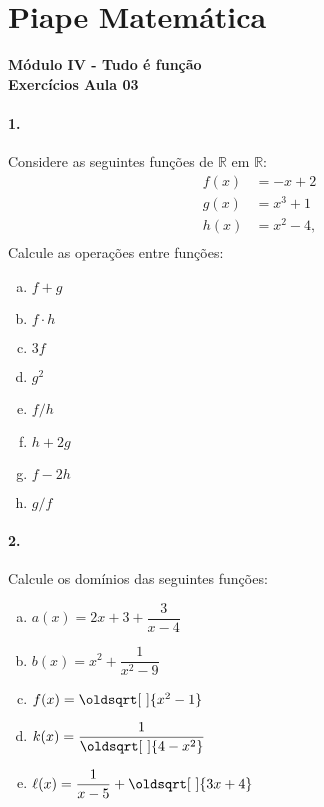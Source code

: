 \documentclass[a4paper,12pt]{article}
\renewcommand*{\sqrt}[2][\ ]{\oldsqrt[#1]{#2}}
\begin{document}
 
  
\section*{Piape Matemática} 
\textbf{Módulo IV - Tudo é função}\\
\textbf{Exercícios Aula 03}    

\begin{multicols}{2}
\paragraph*{1.} Considere as seguintes funções de $\mathbb{R}$ em $\mathbb{R}$:
\begin{align*}
f(x) &= -x + 2\\
g(x) &= x^3 + 1\\
h(x) &= x^2 - 4,\\
\end{align*} 
Calcule as operações entre funções:
\begin{enumerate}[a)] 
    \item $f + g$
    \item $f \cdot h$
    \item $3f$
    \item $g^2$
    \item $f/h$
    \item $h + 2g$
    \item $f- 2h$
    \item $g/f$
\end{enumerate}

\paragraph*{2.} Calcule os domínios das seguintes funções:
\begin{enumerate}[a)]
    \item $a(x) = 2x + 3 + \dfrac{3}{x-4}$
    \item $b(x) = x^2 + \dfrac{1}{x^2 - 9}$
    \item $f(x) = \sqrt{x^2 - 1}$ 
    \item $k(x) = \dfrac{1}{\sqrt{4 - x^2 }}$
    \item $\ell(x) = \dfrac{1}{x - 5} + \sqrt{3x + 4}$
\end{enumerate}

\vspace*{5cm}
\end{multicols}
\end{document}
